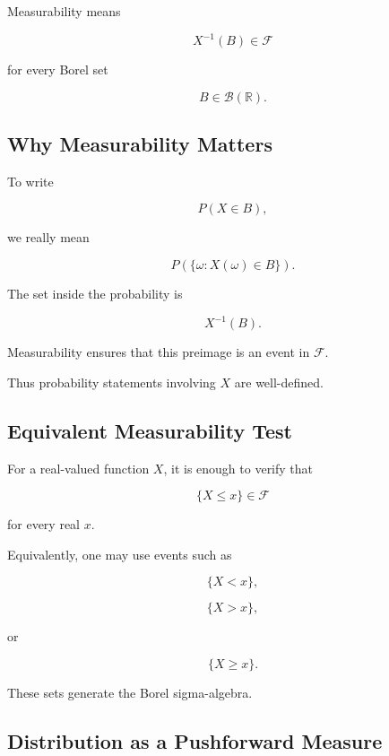 Measurability means

\[
\boxed{
X^{-1}(B)
\in
\mathcal{F}
}
\]

for every Borel set

\[
B\in\mathcal{B}(\mathbb{R}).
\]

\subsection{Why Measurability Matters}
\label{subsec:why-rv-measurability}

To write

\[
P(X\in B),
\]

we really mean

\[
P
\left(
\{\omega:X(\omega)\in B\}
\right).
\]

The set inside the probability is

\[
X^{-1}(B).
\]

Measurability ensures that this preimage is an event in
\(\mathcal{F}\).

Thus probability statements involving \(X\) are well-defined.

\subsection{Equivalent Measurability Test}
\label{subsec:rv-measurability-test}

For a real-valued function \(X\), it is enough to verify that

\[
\boxed{
\{X\leq x\}
\in
\mathcal{F}
}
\]

for every real \(x\).

Equivalently, one may use events such as

\[
\{X<x\},
\]

\[
\{X>x\},
\]

or

\[
\{X\geq x\}.
\]

These sets generate the Borel sigma-algebra.

\subsection{Distribution as a Pushforward Measure}
\label{subsec:distribution-pushforward}

